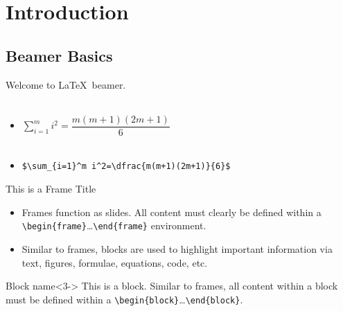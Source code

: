 \section{Introduction}
\subsection{Beamer Basics}

\begin{frame}[fragile] %
Welcome to \LaTeX\ beamer.\\~\
\begin{itemize}
    \item $\sum_{i=1}^m i^2=\dfrac{m(m+1)(2m+1)}{6}$\\~\
    \item \verb|$\sum_{i=1}^m i^2=\dfrac{m(m+1)(2m+1)}{6}$|
\end{itemize}
\end{frame}



\begin{frame}[fragile]{This is a Frame Title}
\begin{itemize}
    \item<1->Frames function as slides. All content must clearly be defined within a \verb+\begin{frame}+\ldots\verb+\end{frame}+ environment.
    \item<2-> Similar to frames, blocks are used to highlight important information via text, figures, formulae, equations, code, etc.
\end{itemize}
\begin{block}{Block name}<3->
This is a block. Similar to frames, all content within a block must be defined within a \verb+\begin{block}+\ldots\verb+\end{block}+.
\end{block}
\end{frame}

